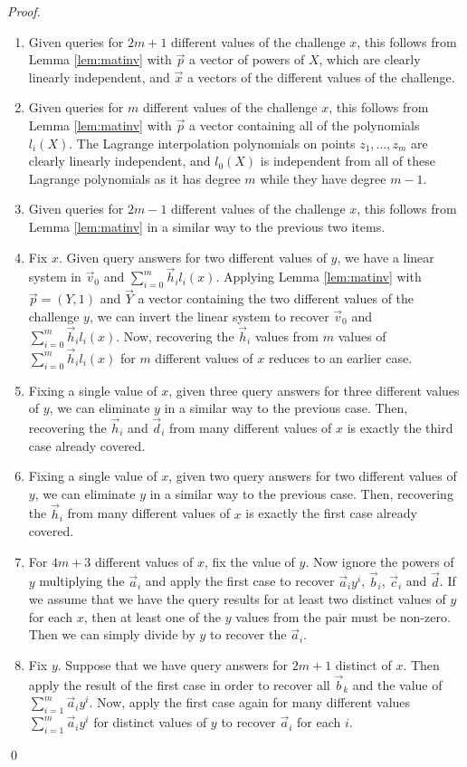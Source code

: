 \begin{proof}
\begin{enumerate}
\item Given queries for $2m+1$ different values of the challenge $x$, this follows from Lemma \ref{lem:matinv} with $\vec{p}$ a vector of powers of $X$, which are clearly linearly independent, and $\vec{x}$ a vectors of the different values of the challenge.
\item Given queries for $m$ different values of the challenge $x$, this follows from Lemma \ref{lem:matinv} with $\vec{p}$ a vector containing all of the polynomials $l_i(X)$. The Lagrange interpolation polynomials on points $z_1,\ldots,z_m$ are clearly linearly independent, and $l_0(X)$ is independent from all of these Lagrange polynomials as it has degree $m$ while they have degree $m-1$.
\item Given queries for $2m-1$ different values of the challenge $x$, this follows from Lemma \ref{lem:matinv} in a similar way to the previous two items.
\item Fix $x$. Given query answers for two different values of $y$, we have a linear system in $\vec{v}_0$ and $\sum_{i=0}^m \vec{h}_i l_i(x)$. Applying Lemma \ref{lem:matinv} with $\vec{p} = (Y,1)$ and $\vec{Y}$ a vector containing the two different values of the challenge $y$, we can invert the linear system to recover $\vec{v}_0$ and $\sum_{i=0}^m \vec{h}_i l_i(x)$. Now, recovering the $\vec{h}_i$ values from $m$ values of $\sum_{i=0}^m \vec{h}_i l_i(x)$ for $m$ different values of $x$ reduces to an earlier case.
\item Fixing a single value of $x$, given three query answers for three different values of $y$, we can eliminate $y$ in a similar way to the previous case. Then, recovering the $\vec{h}_i$ and $\vec{d}_i$ from many different values of $x$ is exactly the third case already covered.
\item Fixing a single value of $x$, given two query answers for two different values of $y$, we can eliminate $y$ in a similar way to the previous case. Then, recovering the $\vec{h}_i$ from many different values of $x$ is exactly the first case already covered.
\item For $4m+3$ different values of $x$, fix the value of $y$. Now ignore the powers of $y$ multiplying the $\vec{a}_i$ and apply the first case to recover $\vec{a}_i y^i$, $\vec{b}_i$, $\vec{c}_i$ and $\vec{d}$. If we assume that we have the query results for at least two distinct values of $y$ for each $x$, then at least one of the $y$ values from the pair must be non-zero. Then we can simply divide by $y$ to recover the $\vec{a}_i$.
\item Fix $y$. Suppose that we have query answers for $2m+1$ distinct of $x$. Then apply the result of the first case in order to recover all $\vec{b}_k$ and the value of $\sum_{i=1}^m \vec{a}_i y^i$. Now, apply the first case again for many different values $\sum_{i=1}^m \vec{a}_i y^i$ for distinct values of $y$ to recover $\vec{a}_i$ for each $i$.
\end{enumerate}
\qed
\end{proof}
